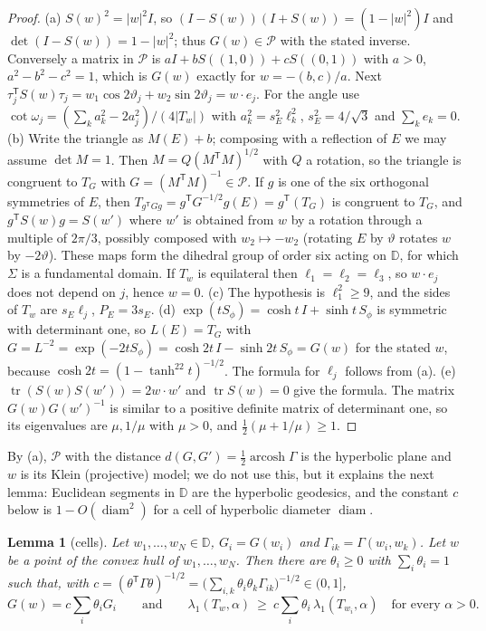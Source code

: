 \documentclass[11pt]{article}
\newtheorem{lemma}[theorem]{Lemma}
\theoremstyle{remark}
\newcommand{\cP}{\mathcal{P}}
\DeclareMathOperator{\tr}{tr}
\DeclareMathOperator{\diam}{diam}
\begin{document}
\begin{proof}
(a) $S(w)^2=|w|^2I$, so $(I-S(w))(I+S(w))=(1-|w|^2)I$ and $\det(I-S(w))=1-|w|^2$; thus
$G(w)\in\cP$ with the stated inverse. Conversely a matrix in $\cP$ is $aI+bS((1,0))+cS((0,1))$
with $a>0$, $a^2-b^2-c^2=1$, which is $G(w)$ exactly for $w=-(b,c)/a$. Next
$\tau_j^{\mathsf T}S(w)\tau_j=w_1\cos2\vartheta_j+w_2\sin2\vartheta_j=w\cdot e_j$. For the angle
use $\cot\omega_j=(\sum_ka_k^2-2a_j^2)/(4|T_w|)$ with $a_k^2=s_E^2\ell_k^2$, $s_E^2=4/\sqrt3$ and
$\sum_ke_k=0$.
(b) Write the triangle as $M(E)+b$; composing with a reflection of $E$ we may assume
$\det M=1$. Then $M=Q(M^{\mathsf T}M)^{1/2}$ with $Q$ a rotation, so the triangle is congruent
to $T_G$ with $G=(M^{\mathsf T}M)^{-1}\in\cP$. If $g$ is one of the six orthogonal symmetries of
$E$, then $T_{g^{\mathsf T}Gg}=g^{\mathsf T}G^{-1/2}g(E)=g^{\mathsf T}(T_G)$ is congruent to
$T_G$, and $g^{\mathsf T}S(w)g=S(w')$ where $w'$ is obtained from $w$ by a rotation through a
multiple of $2\pi/3$, possibly composed with $w_2\mapsto-w_2$ (rotating $E$ by $\vartheta$
rotates $w$ by $-2\vartheta$). These maps form the dihedral group of order six acting on
$\mathbb D$, for which $\Sigma$ is a fundamental domain. If $T_w$ is equilateral then
$\ell_1=\ell_2=\ell_3$, so $w\cdot e_j$ does not depend on $j$, hence $w=0$.
(c) The hypothesis is $\ell_1^2\ge9$, and the sides of $T_w$ are $s_E\ell_j$, $P_E=3s_E$.
(d) $\exp(tS_\phi)=\cosh t\,I+\sinh t\,S_\phi$ is symmetric with determinant one, so
$L(E)=T_G$ with $G=L^{-2}=\exp(-2tS_\phi)=\cosh2t\,I-\sinh2t\,S_\phi=G(w)$ for the stated $w$,
because $\cosh2t=(1-\tanh^22t)^{-1/2}$. The formula for $\ell_j$ follows from (a).
(e) $\tr(S(w)S(w'))=2w\cdot w'$ and $\tr S(w)=0$ give the formula. The matrix
$G(w)G(w')^{-1}$ is similar to a positive definite matrix of determinant one, so its
eigenvalues are $\mu,1/\mu$ with $\mu>0$, and $\frac12(\mu+1/\mu)\ge1$.
\end{proof}

By (a), $\cP$ with the distance $d(G,G')=\frac12\operatorname{arcosh}\Gamma$ is the hyperbolic
plane and $w$ is its Klein (projective) model; we do not use this, but it explains the next
lemma: Euclidean segments in $\mathbb D$ are the hyperbolic geodesics, and the constant $c$ below
is $1-O(\diam^2)$ for a cell of hyperbolic diameter $\diam$.

\begin{lemma}[cells]\label{p-lem:cell}
Let $w_1,\dots,w_N\in\mathbb D$, $G_i=G(w_i)$ and $\Gamma_{ik}=\Gamma(w_i,w_k)$. Let $w$ be a
point of the convex hull of $w_1,\dots,w_N$. Then there are $\theta_i\ge0$ with
$\sum_i\theta_i=1$ such that, with
$c=(\theta^{\mathsf T}\Gamma\theta)^{-1/2}=\bigl(\sum_{i,k}\theta_i\theta_k\Gamma_{ik}\bigr)^{-1/2}\in(0,1]$,
\begin{equation}\label{p-eq:cell}
  G(w)=c\sum_i\theta_iG_i\qquad\text{and}\qquad
  \lambda_1(T_w,\alpha)\ \ge\ c\sum_i\theta_i\,\lambda_1(T_{w_i},\alpha)\quad\text{for every }\alpha>0 .
\end{equation}
\end{lemma}
\end{document}
